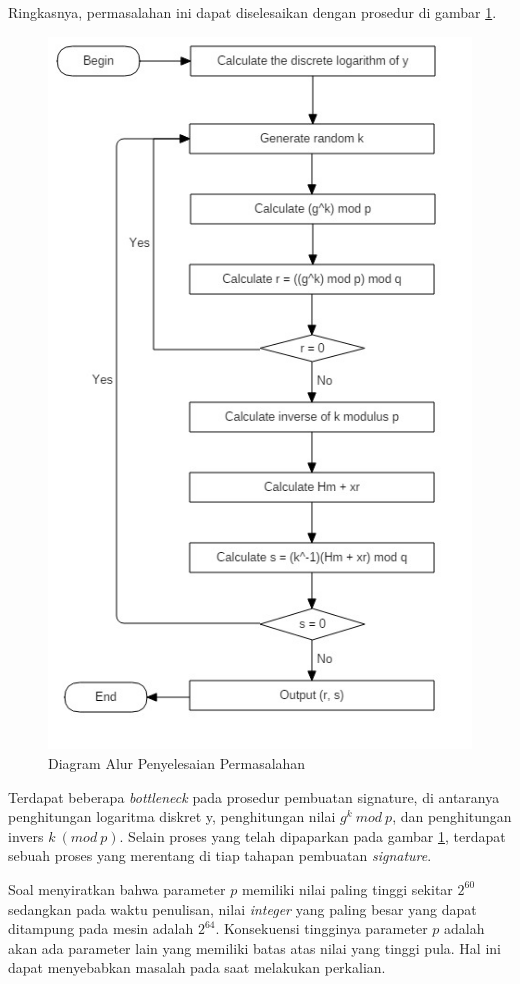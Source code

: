 Ringkasnya, permasalahan ini dapat diselesaikan dengan prosedur di gambar \ref{fig:main_diagram}.
\begin{figure}
	\Centering
	\includegraphics [scale=0.5]{bab2/img/main-diagram}
	\caption {Diagram Alur Penyelesaian Permasalahan}
	\label {fig:main_diagram}
\end{figure}
Terdapat beberapa \textit{bottleneck} pada prosedur pembuatan signature, di antaranya penghitungan logaritma diskret y, penghitungan nilai $g^k\ mod\ p$, dan penghitungan invers $k\ \left(mod\ p\right)$. Selain proses yang telah dipaparkan pada gambar \ref{fig:main_diagram}, terdapat sebuah proses yang merentang di tiap tahapan pembuatan \textit{signature}.

Soal menyiratkan bahwa parameter $p$ memiliki nilai paling tinggi sekitar $2^{60}$ sedangkan pada waktu penulisan, nilai \textit{integer} yang paling besar yang dapat ditampung pada mesin adalah $2^{64}$. Konsekuensi tingginya parameter $p$ adalah akan ada parameter lain yang memiliki batas atas nilai yang tinggi pula. Hal ini dapat menyebabkan masalah pada saat melakukan perkalian.


